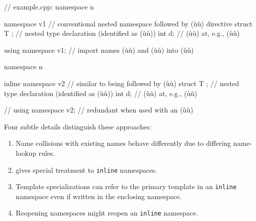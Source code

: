 \begin{emcppslisting}
// example.cpp:
namespace n
{
    namespace v1  // conventional nested namespace followed by (ù{}ù) directive
    {
        struct T { };     // nested type declaration (identified as (ù{}ù))
        int d;            // (ù{}ù) at, e.g., (ù{}ù)
    }

    using namespace v1;   // import names (ù{}ù) and (ù{}ù) into (ù{}ù)
}

namespace n
{
    inline namespace v2   // similar to being followed by (ù{}ù)
    {
        struct T { };     // nested type declaration (identified as (ù{}ù))
        int d;            // (ù{}ù) at, e.g., (ù{}ù)
    }

    // using namespace v2;  // redundant when used with an (ù{}ù)
}
\end{emcppslisting}


\noindent Four subtle details distinguish these approaches:
\begin{enumerate}
\item{Name collisions with existing names behave differently due to differing name-lookup rules.}
\item{ gives special treatment to \lstinline!inline! namespaces.}
\item{Template specializations can refer to the primary template in an \lstinline!inline! namespace even if written in the enclosing namespace.}
\item{Reopening namespaces might reopen an \lstinline!inline! namespace.}
\end{enumerate}

